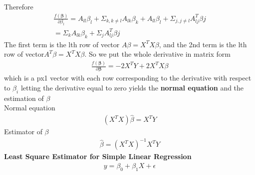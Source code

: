 \documentclass[a4paper]{article}
\begin{document}
Therefore
\begin{align*}
\frac{f(\boldsymbol \beta)}{\partial \beta_l}  = A_{ll} \beta_l + \Sigma_{k, k\neq l} A_{lk}\beta_{k} + A_{ll} \beta_l + \Sigma_{j, j \neq l} A^T_{lj}\beta{j} \\
= \Sigma_{k} A_{lk}\beta_{k} + \Sigma_{j} A^T_{lj}\beta{j}
\end{align*}
The first term is the lth row of vector $A\beta = X^TX\beta$, and the 2nd term is the lth row of vector$A^T\beta=X^TX\beta$. So we put the whole derivative in matrix form
\begin{align*}
\frac{f(\boldsymbol \beta)}{\partial {\boldsymbol \beta}} = -2X^TY+2X^TX\beta
\end{align*}
which is a px1 vector with each row corresponding to the derivative with respect to $\beta_i$
letting the derivative equal to zero yields the {\bf normal equation} and the estimation of $\beta$\\
Normal equation
\begin{align*}
(X^TX) \hat \beta = X^TY
\end{align*}
Estimator of $\beta$
\begin{align*}
\hat \beta = (X^TX)^{-1}X^TY
\end{align*}
{\bf Least Square Estimator for Simple Linear Regression}\\
\begin{align*}
y =  \beta_0 + \beta_1 X + \epsilon\\
\end{align*}
\end{document}
